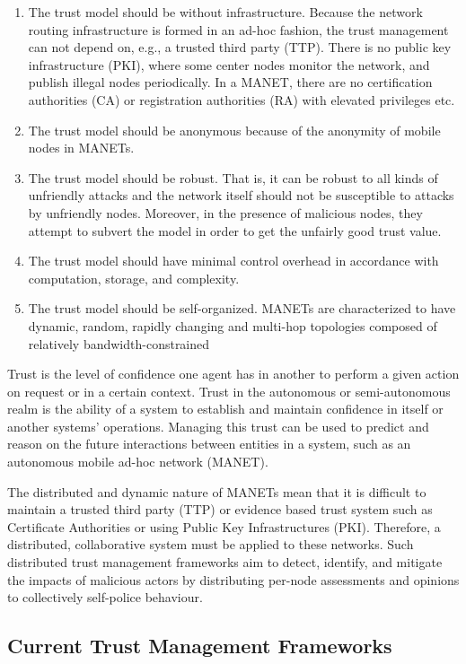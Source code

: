 \begin{enumerate}
  \item The trust model should be without infrastructure. Because the network routing infrastructure is formed in an ad-hoc fashion, the trust management can not depend on, e.g., a trusted third party (TTP). There is no public key infrastructure (PKI), where some center nodes monitor the network, and publish illegal nodes periodically. In a MANET, there are no certification authorities (CA) or registration authorities (RA) with elevated privileges etc.
  \item The trust model should be anonymous because of the anonymity of mobile nodes in MANETs.
  \item The trust model should be robust. That is, it can be robust to all kinds of unfriendly attacks and the network itself should not be susceptible to attacks by unfriendly nodes. Moreover, in the presence of malicious nodes, they attempt to subvert the model in order to get the unfairly good trust value.
  \item The trust model should have minimal control overhead in accordance with computation, storage, and complexity.
  \item The trust model should be self-organized. MANETs are characterized to have dynamic, random, rapidly changing and multi-hop topologies composed of relatively bandwidth-constrained
\end{enumerate}

Trust is the level of confidence one agent has in another to perform a given action on request or in a certain context. Trust in the autonomous or semi-autonomous realm is the ability of a system to establish and maintain confidence in itself or another systems' operations. 
Managing this trust can be used to predict and reason on the future interactions between entities in a system, such as an autonomous mobile ad-hoc network (MANET).

The distributed and dynamic nature of MANETs mean that it is difficult to maintain a trusted third party (TTP) or evidence based trust system such as Certificate Authorities or using Public Key Infrastructures (PKI).
Therefore, a distributed, collaborative system must be applied to these networks.
Such distributed trust management frameworks aim to detect, identify, and mitigate the impacts of malicious actors by distributing per-node assessments and opinions to collectively self-police behaviour.

\subsection{Current Trust Management Frameworks}


